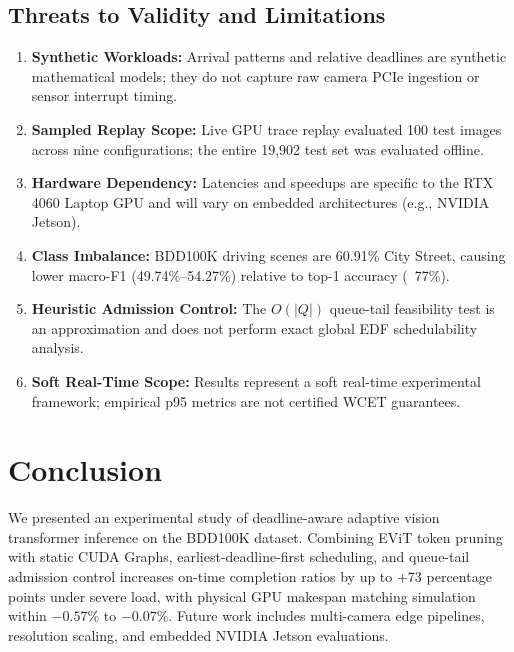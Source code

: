 \documentclass[conference]{IEEEtran}
\begin{document}
\subsection{Threats to Validity and Limitations}
\begin{enumerate}
    \item \textbf{Synthetic Workloads:} Arrival patterns and relative deadlines are synthetic mathematical models; they do not capture raw camera PCIe ingestion or sensor interrupt timing.
    \item \textbf{Sampled Replay Scope:} Live GPU trace replay evaluated 100 test images across nine configurations; the entire 19,902 test set was evaluated offline.
    \item \textbf{Hardware Dependency:} Latencies and speedups are specific to the RTX 4060 Laptop GPU and will vary on embedded architectures (e.g., NVIDIA Jetson).
    \item \textbf{Class Imbalance:} BDD100K driving scenes are 60.91\% City Street, causing lower macro-F1 (49.74\%--54.27\%) relative to top-1 accuracy (~77\%).
    \item \textbf{Heuristic Admission Control:} The $O(|Q|)$ queue-tail feasibility test is an approximation and does not perform exact global EDF schedulability analysis.
    \item \textbf{Soft Real-Time Scope:} Results represent a soft real-time experimental framework; empirical p95 metrics are not certified WCET guarantees.
\end{enumerate}

\section{Conclusion}

We presented an experimental study of deadline-aware adaptive vision transformer inference on the BDD100K dataset. Combining EViT token pruning with static CUDA Graphs, earliest-deadline-first scheduling, and queue-tail admission control increases on-time completion ratios by up to +73 percentage points under severe load, with physical GPU makespan matching simulation within $-0.57\%$ to $-0.07\%$. Future work includes multi-camera edge pipelines, resolution scaling, and embedded NVIDIA Jetson evaluations.



\end{document}
